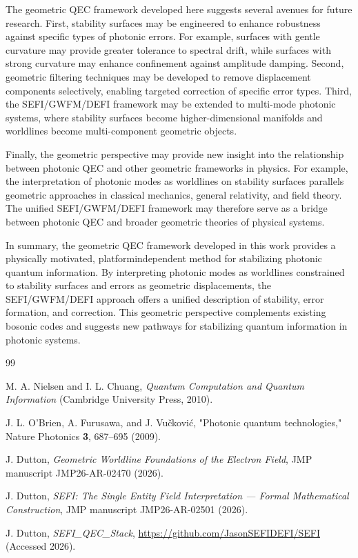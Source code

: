 \documentclass[aip,adv,reprint,floatfix]{revtex4-2}
\begin{document}
The geometric QEC framework developed here suggests several avenues for future research. First, stability
surfaces may be engineered to enhance robustness against
specific types of photonic errors. For example, surfaces
with gentle curvature may provide greater tolerance to
spectral drift, while surfaces with strong curvature may
enhance confinement against amplitude damping. Second, geometric filtering techniques may be developed to
remove displacement components selectively, enabling
targeted correction of specific error types. Third, the
SEFI/GWFM/DEFI framework may be extended to
multi-mode photonic systems, where stability surfaces
become higher-dimensional manifolds and worldlines
become multi-component geometric objects.

Finally, the geometric perspective may provide new insight into the relationship between photonic QEC and
other geometric frameworks in physics.\cite{DuttonElectronField2026}
For example, the
interpretation of photonic modes as worldlines on stability surfaces parallels geometric approaches in classical
mechanics, general relativity, and field theory. The unified SEFI/GWFM/DEFI framework may therefore serve
as a bridge between photonic QEC and broader geometric theories of physical systems.

In summary, the geometric QEC framework developed
in this work provides a physically motivated, platformindependent method for stabilizing photonic quantum
information. By interpreting photonic modes as worldlines constrained to stability surfaces and errors as geometric displacements, the SEFI/GWFM/DEFI approach
offers a unified description of stability, error formation,
and correction. This geometric perspective complements
existing bosonic codes and suggests new pathways for
stabilizing quantum information in photonic systems.


\begin{thebibliography}{99}

M. A. Nielsen and I. L. Chuang,
\textit{Quantum Computation and Quantum Information}
(Cambridge University Press, 2010).

J. L. O'Brien, A. Furusawa, and J. Vu\v{c}kovi\'{c},
"Photonic quantum technologies,"
Nature Photonics \textbf{3}, 687--695 (2009).

J. Dutton,
\textit{Geometric Worldline Foundations of the Electron Field},
JMP manuscript JMP26-AR-02470 (2026).

J. Dutton,
\textit{SEFI: The Single Entity Field Interpretation --- Formal Mathematical Construction},
JMP manuscript JMP26-AR-02501 (2026).

J. Dutton,
\textit{SEFI\_QEC\_Stack},
\url{https://github.com/JasonSEFIDEFI/SEFI}
(Accessed 2026).

\end{thebibliography}
\end{document}
